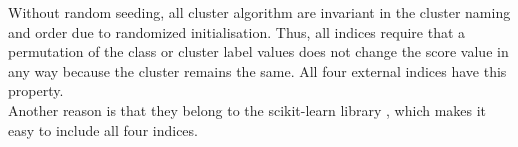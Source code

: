 Without random seeding, all cluster algorithm are invariant in the cluster naming and order due to randomized initialisation. Thus, all indices require that a permutation of the class or cluster label values does not change the score value in any way because the cluster remains the same. All four external indices have this property.\\
Another reason is that they belong to the scikit-learn library \cite{scikitlearn}, which makes it easy to include all four indices.

